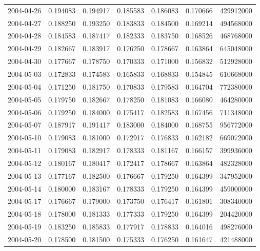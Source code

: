 \begin{tabular}{lrrrrrr}
2004-04-26 &    0.194083 &    0.194917 &    0.185583 &    0.186083 &    0.170666 &   429912000 \\
2004-04-27 &    0.188250 &    0.193250 &    0.183833 &    0.184500 &    0.169214 &   494568000 \\
2004-04-28 &    0.184583 &    0.187417 &    0.182333 &    0.183750 &    0.168526 &   468768000 \\
2004-04-29 &    0.182667 &    0.183917 &    0.176250 &    0.178667 &    0.163864 &   645048000 \\
2004-04-30 &    0.177667 &    0.178750 &    0.170333 &    0.171000 &    0.156832 &   512928000 \\
2004-05-03 &    0.172833 &    0.174583 &    0.165833 &    0.168833 &    0.154845 &   610668000 \\
2004-05-04 &    0.171250 &    0.181750 &    0.170833 &    0.179583 &    0.164704 &   772380000 \\
2004-05-05 &    0.179750 &    0.182667 &    0.178250 &    0.181083 &    0.166080 &   464280000 \\
2004-05-06 &    0.179250 &    0.184000 &    0.175417 &    0.182583 &    0.167456 &   711348000 \\
2004-05-07 &    0.187917 &    0.191417 &    0.183000 &    0.184000 &    0.168755 &   956772000 \\
2004-05-10 &    0.179083 &    0.181000 &    0.172917 &    0.176833 &    0.162182 &   669072000 \\
2004-05-11 &    0.179083 &    0.182917 &    0.178333 &    0.181167 &    0.166157 &   399936000 \\
2004-05-12 &    0.180167 &    0.180417 &    0.172417 &    0.178667 &    0.163864 &   482328000 \\
2004-05-13 &    0.177167 &    0.182500 &    0.176667 &    0.179250 &    0.164399 &   347952000 \\
2004-05-14 &    0.180000 &    0.183167 &    0.178333 &    0.179250 &    0.164399 &   459000000 \\
2004-05-17 &    0.176667 &    0.179000 &    0.173750 &    0.176417 &    0.161801 &   308340000 \\
2004-05-18 &    0.178000 &    0.181333 &    0.177333 &    0.179250 &    0.164399 &   204420000 \\
2004-05-19 &    0.183250 &    0.185833 &    0.177917 &    0.178833 &    0.164016 &   498276000 \\
2004-05-20 &    0.178500 &    0.181500 &    0.175333 &    0.176250 &    0.161647 &   421488000 \\

\end{tabular}
